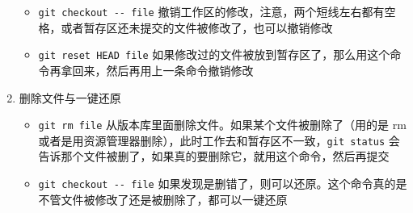 \documentclass[UTF8]{ctexart}
\begin{document}
\begin{enumerate}
\begin{itemize}
    \item \verb|git checkout -- file| 撤销工作区的修改，注意，两个短线左右都有空格，或者暂存区还未提交的文件被修改了，也可以撤销修改
    \item \verb|git reset HEAD file| 如果修改过的文件被放到暂存区了，那么用这个命令再拿回来，然后再用上一条命令撤销修改
  \end{itemize}
  \item 删除文件与一键还原
  \begin{itemize}
    \item \verb|git rm file| 从版本库里面删除文件。如果某个文件被删除了（用的是 rm 或者是用资源管理器删除），此时工作去和暂存区不一致，\verb|git status| 会告诉那个文件被删了，如果真的要删除它，就用这个命令，然后再提交
    \item \verb|git checkout -- file| 如果发现是删错了，则可以还原。这个命令真的是不管文件被修改了还是被删除了，都可以一键还原
  \end{itemize}
\end{enumerate}
\end{document}
